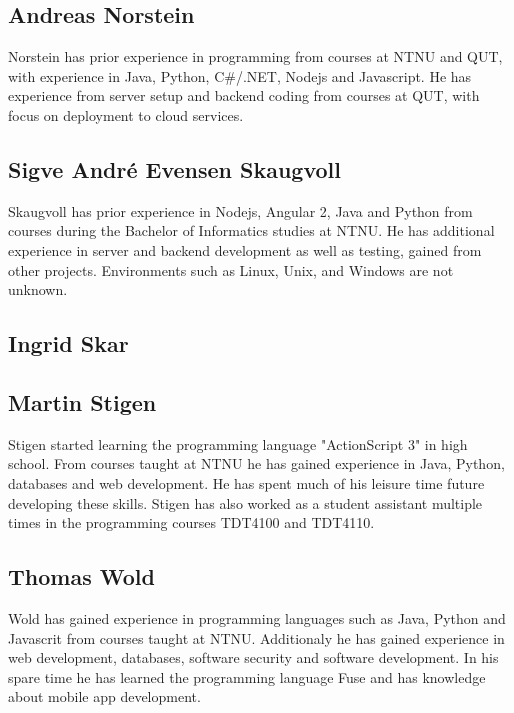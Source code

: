 \subsection{Andreas Norstein}
Norstein has prior experience in programming from courses at NTNU and QUT, with experience in Java, Python, C\#/.NET, Nodejs and Javascript. He has experience from server setup and backend coding from courses at QUT, with focus on deployment to cloud services.  

\subsection{Sigve André Evensen Skaugvoll}
Skaugvoll has prior experience in Nodejs, Angular 2, Java and Python from courses during the Bachelor of Informatics studies at NTNU. He has additional experience in server and backend development as well as testing, gained from other projects. Environments such as Linux, Unix, and Windows are not unknown.

\subsection{Ingrid Skar}

\subsection{Martin Stigen}
Stigen started learning the programming language "ActionScript 3" in high school. From courses taught at NTNU he has gained experience in Java, Python, databases and web development. He has spent much of his leisure time future developing these skills. Stigen has also worked as a student assistant multiple times in the programming courses TDT4100 and TDT4110. 

\subsection{Thomas Wold}
Wold has gained experience in programming languages such as Java, Python and Javascrit from courses taught at NTNU. Additionaly he has gained experience in web development, databases, software security and software development. In his spare time he has learned the programming language Fuse and has knowledge about mobile app development.

\cleardoublepage